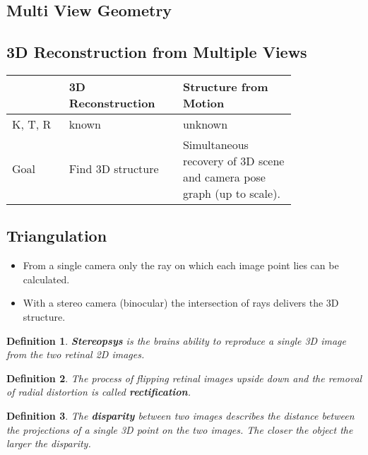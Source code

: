 \documentclass[10pt,a4paper]{scrartcl}
\newtheorem{define}{Definition}
\begin{document}
\begin{multicols*}{2}
\section{Multi View Geometry}

\subsection{3D Reconstruction from Multiple Views}

\begin{center}
\begin{tabular}{l|p{0.4\linewidth}|p{0.4\linewidth}}
&3D Reconstruction &Structure from Motion\\\midrule
K, T, R&known&unknown\\\midrule
Goal&Find 3D structure&Simultaneous recovery of 3D scene and camera pose graph (up to scale).
\end{tabular}
\end{center}

\subsection{Triangulation}

\begin{itemize}
\item From a single camera only the ray on which each image point lies can be calculated.
\item With a stereo camera (binocular) the intersection of rays delivers the 3D structure.
\end{itemize}

\begin{define}
\textbf{Stereopsys} is the brains ability to reproduce a single 3D image from the two retinal 2D images.
\end{define}

\begin{define}
The process of flipping retinal images upside down and the removal of radial distortion is called \textbf{rectification}.
\end{define}

\begin{define}
The \textbf{disparity} between two images describes the distance between the projections of a single 3D point on the two images. The closer the object the larger the disparity.
\end{define}



\end{multicols*}
\end{document}
